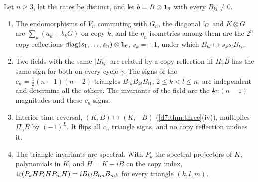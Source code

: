 \begin{theorem}
\label{e4:thm:cycles}
Let $n\ge3$, let the rates be distinct, and let $b=B\otimes\mathbf 1_6$ with every $B_{kl}\neq0$.
\begin{enumerate}[label=(\roman*),leftmargin=2.2em]
\item The endomorphisms of $V_n$ commuting with $G_n$, the diagonal $\mathfrak l_G$ and $K\otimes G$ are $\sum_k(a_k+b_kG)$ on copy $k$, and the $\eta_n$-isometries
among them are the $2^n$ copy reflections $\operatorname{diag}(s_1,\dots,s_n)\otimes\mathbf 1_6$, $s_k=\pm1$, under which $B_{kl}\mapsto s_ks_lB_{kl}$.
\item Two fields with the same $|B_{kl}|$ are related by a copy reflection iff $\Pi_\gamma B$ has the same sign for both on every cycle $\gamma$. The
signs of the $c_n=\tfrac12(n-1)(n-2)$ triangles $B_{1k}B_{kl}B_{l1}$, $2\le k<l\le n$, are independent and determine all the others. The
invariants of the field are the $\tfrac12n(n-1)$ magnitudes and these $c_n$ signs.
\item Interior time reversal, $(K,B)\mapsto(K,-B)$ (\cref{d7:thm:three}(iv)), multiplies $\Pi_\gamma B$ by $(-1)^L$. It flips all $c_n$ triangle signs,
and no copy reflection undoes it.
\item The triangle invariants are spectral. With $P_k$ the spectral projectors of $K$, polynomials in $K$, and $H=K-iB$ on the copy index,
$\operatorname{tr}(P_kHP_lHP_mH)=iB_{kl}B_{lm}B_{mk}$ for every triangle $(k,l,m)$.
\end{enumerate}
\end{theorem}

